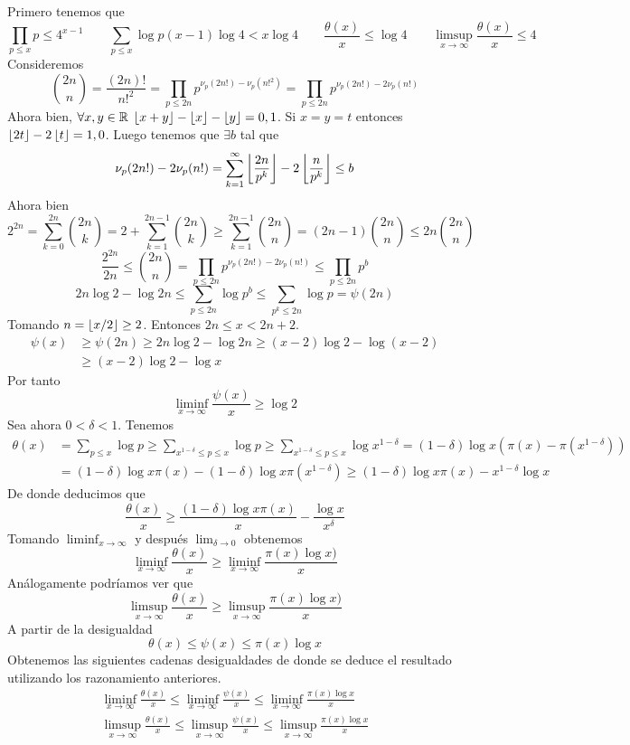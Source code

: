 \documentclass[TAN.tex]{subfiles}
\begin{document}
\begin{dem}
Primero tenemos que
$$
\prod_{p\leq x}p\leq 4^{x-1} \qquad \sum_{p\leq x}\log p (x-1)\log 4 <  x \log 4 \qquad \frac{\theta(x)}{x} \leq \log 4 \qquad \limsup_{x\to\infty} \frac{\theta(x)}{x} \leq 4
$$
Consideremos 
$$
\binom{2n}{n} =  \frac{(2n)!}{n!^2} = \prod_{p\leq 2n} p^{\nu_p(2n!)-\nu_p(n!^2)} = \prod_{p\leq 2n} p^{\nu_p(2n!)-2\nu_p(n!)}
$$
Ahora bien, $\forall x,y \in \mathbb{R}$ $\left\lfloor{x+y}\right\rfloor-\left\lfloor{x}\right\rfloor-\left\lfloor{y}\right\rfloor=0,1$. Si $x=y=t$ entonces $\left\lfloor{2t}\right\rfloor-2\left\lfloor{t}\right\rfloor=1,0$. Luego tenemos que $\exists b$ tal que
$$
\nu_p(2n!)-2\nu_p(n!) = \sum_{k=1}^\infty \left\lfloor{\frac{2n}{p^k}}\right\rfloor-2\left\lfloor{\frac{n}{p^k}}\right\rfloor  \leq b
$$
Ahora bien 
$$
2^{2n}=\sum_{k=0}^{2n} \binom{2n}{k} = 2 + \sum_{k=1}^{2n-1} \binom{2n}{k} \geq \sum_{k=1}^{2n-1} \binom{2n}{n} = (2n-1)\binom{2n}{n} \leq 2n\binom{2n}{n} 
$$
$$
 \frac{2^{2n}}{2n} \leq \binom{2n}{n} =  \prod_{p\leq 2n} p^{\nu_p(2n!)-2\nu_p(n!)} \leq \prod_{p\leq 2n} p^b $$
 $$
  2n\log 2 -\log 2n \leq \sum_{p\leq 2n}\log p^b \leq \sum_{p^k\leq 2n}\log p= \psi(2n)
$$
Tomando $n=\left\lfloor{x/2}\right\rfloor\geq 2$. Entonces $2n\leq x < 2n+2$.
\begin{align*}
\psi(x)&\geq \psi(2n) \geq 2n\log 2-\log 2n \geq (x-2)\log 2-\log (x-2)\\
&\geq (x-2)\log 2 - \log x
\end{align*}
Por tanto
$$
\liminf_{x\to\infty} \frac{\psi(x)}{x}\geq \log 2
$$
Sea ahora $0<\delta < 1$. Tenemos
\begin{align*}
\theta(x)&=\sum_{p\leq x}\log p\geq\sum_{x^{1-\delta}\leq p\leq x} \log p \geq \sum_{x^{1-\delta}\leq p\leq x}\log x^{1-\delta}  = (1-\delta)\log x(\pi(x)-\pi(x^{1-\delta}))\\
&=(1-\delta)\log x\pi(x)-(1-\delta)\log x \pi(x^{1-\delta}) \geq (1-\delta)\log x \pi(x)- x^{1-\delta}\log x
\end{align*}
De donde deducimos que
$$
\frac{\theta(x)}{x} \geq \frac{(1-\delta)\log x \pi(x)}{x}-\frac{\log x}{x^{\delta}}
$$
Tomando $\liminf_{x\to\infty}$ y después $\lim_{\delta \to 0}$ obtenemos
$$
\liminf_{x\to\infty}\frac{\theta(x)}{x}\geq \liminf_{x\to\infty}\frac{\pi(x)\log x)}{x}
$$
Análogamente podríamos ver que
$$
\limsup_{x\to\infty}\frac{\theta(x)}{x}\geq \limsup_{x\to\infty}\frac{\pi(x)\log x)}{x}
$$
A partir de la desigualdad
$$
\theta(x)\leq \psi(x) \leq \pi(x)\log x 
$$
Obtenemos las siguientes cadenas desigualdades de donde se deduce el resultado utilizando los razonamiento anteriores.
\begin{gather*}
\liminf_{x\to\infty} \frac{\theta(x)}{x} \leq \liminf_{x\to\infty} \frac{\psi(x)}{x} \leq \liminf_{x\to\infty}\frac{\pi(x)\log x}{x}\\
\limsup_{x\to\infty} \frac{\theta(x)}{x} \leq \limsup_{x\to\infty} \frac{\psi(x)}{x} \leq \limsup_{x\to\infty}\frac{\pi(x)\log x}{x}
\end{gather*}
\end{dem}
\newpage
\end{document}
